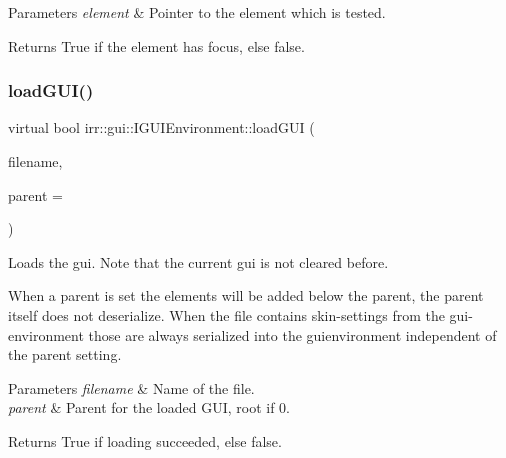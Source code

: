 \begin{DoxyParams}{Parameters}
{\em element} & Pointer to the element which is tested. \\
\hline
\end{DoxyParams}
\begin{DoxyReturn}{Returns}
True if the element has focus, else false. 
\end{DoxyReturn}
\mbox{\label{classirr_1_1gui_1_1IGUIEnvironment_a6e847a40e5c97c846f2d654605ae13a0}} 
\subsubsection{\texorpdfstring{load\+G\+U\+I()}{loadGUI()}\hspace{0.1cm}{\footnotesize\ttfamily [1/4]}}
{\footnotesize\ttfamily virtual bool irr\+::gui\+::\+I\+G\+U\+I\+Environment\+::load\+G\+UI (\begin{DoxyParamCaption}\item[{const \hyperlink{namespaceirr_1_1io_a6468281622ce3a1c46b72e19f32dded5}{io\+::path} \&}]{filename,  }\item[{\hyperlink{classirr_1_1gui_1_1IGUIElement}{I\+G\+U\+I\+Element} $\ast$}]{parent = {} }\end{DoxyParamCaption})\hspace{0.3cm}{\ttfamily [pure virtual]}}



Loads the gui. Note that the current gui is not cleared before. 

When a parent is set the elements will be added below the parent, the parent itself does not deserialize. When the file contains skin-\/settings from the gui-\/environment those are always serialized into the guienvironment independent of the parent setting. 
\begin{DoxyParams}{Parameters}
{\em filename} & Name of the file. \\
\hline
{\em parent} & Parent for the loaded G\+UI, root if 0. \\
\hline
\end{DoxyParams}
\begin{DoxyReturn}{Returns}
True if loading succeeded, else false. 
\end{DoxyReturn}
\mbox{\label{classirr_1_1gui_1_1IGUIEnvironment_a6e847a40e5c97c846f2d654605ae13a0}} 
